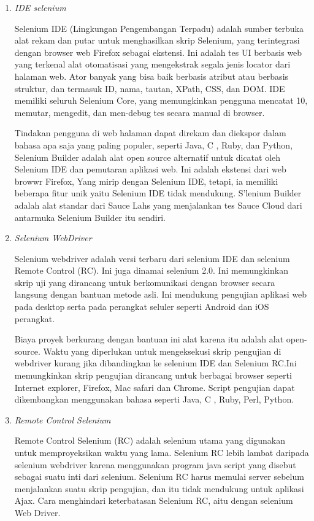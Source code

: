 \begin{enumerate}

\item \textit{IDE selenium}
\par Selenium IDE (Lingkungan Pengembangan Terpadu) adalah sumber terbuka alat rekam dan putar untuk menghasilkan skrip Selenium, yang terintegrasi dengan browser web Firefox sebagai ekstensi. Ini adalah tes UI berbasis web yang terkenal alat otomatisasi yang mengekstrak segala jenis locator dari halaman web. Ator banyak yang bisa baik berbasis atribut atau berbasis struktur, dan termasuk ID, nama, tautan, XPath, CSS, dan DOM. IDE memiliki seluruh Selenium Core, yang memungkinkan pengguna mencatat 10, memutar, mengedit, dan men-debug tes secara manual di browser. 
\par Tindakan pengguna di web halaman dapat direkam dan diekspor dalam bahasa apa saja yang paling populer, seperti Java, C , Ruby, dan Python, Selenium Builder adalah alat open source alternatif untuk dicatat oleh Selenium IDE dan pemutaran aplikasi web. Ini adalah ekstensi dari web browwr Firefox, Yang mirip dengan Selenium IDE, tetapi, ia memiliki beberapa fitur unik yaitu Selenium IDE tidak mendukung. S'lenium Builder adalah alat standar dari Sauce Lahs yang menjalankan tes Sauce Cloud dari antarmuka Selenium Builder itu sendiri.

\item \textit{Selenium WebDriver}
\par Selenium webdriver adalah versi terbaru dari selenium IDE dan selenium Remote Control (RC). Ini juga dinamai selenium 2.0. Ini memungkinkan skrip uji yang dirancang untuk berkomunikasi dengan browser secara langsung dengan bantuan metode asli. Ini mendukung pengujian aplikasi web pada desktop serta pada perangkat seluler seperti Android dan iOS
perangkat. 
\par Biaya proyek berkurang dengan bantuan ini alat karena itu adalah alat open-source. Waktu yang diperlukan untuk mengeksekusi skrip pengujian di webdriver kurang jika dibandingkan ke selenium IDE dan Selenium RC.Ini memungkinkan skrip pengujian dirancang untuk berbagai browser seperti Internet explorer, Firefox, Mac safari dan Chrome. Script pengujian dapat dikembangkan menggunakan bahasa seperti Java, C , Ruby, Perl, Python.


\item \textit{Remote Control Selenium}
\par Remote Control Selenium (RC) adalah selenium utama yang digunakan untuk memproyeksikan waktu yang lama. Selenium RC lebih lambat daripada selenium webdriver karena menggunakan program java script yang disebut sebagai suatu inti dari selenium. Selenium RC harus memulai server sebelum menjalankan suatu skrip pengujian, dan itu tidak mendukung untuk aplikasi Ajax. Cara menghindari keterbatasan Selenium RC, aitu dengan selenium Web Driver.


\end{enumerate}
